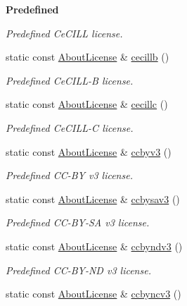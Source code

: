 \begin{Indent}{\bf Predefined}
\begin{DoxyCompactItemize}
\begin{DoxyCompactList}\small\item\em Predefined Ce\-C\-I\-L\-L license. \end{DoxyCompactList}\item 
static const \hyperlink{exceptionmagrathea_1_1AboutLicense}{About\-License} \& \hyperlink{exceptionmagrathea_1_1AboutLicense_a9ca054706cf0da00d216611cb4c56c69}{cecillb} ()
\begin{DoxyCompactList}\small\item\em Predefined Ce\-C\-I\-L\-L-\/\-B license. \end{DoxyCompactList}\item 
static const \hyperlink{exceptionmagrathea_1_1AboutLicense}{About\-License} \& \hyperlink{exceptionmagrathea_1_1AboutLicense_a393f259609519de6f93ec45ad0ff1cad}{cecillc} ()
\begin{DoxyCompactList}\small\item\em Predefined Ce\-C\-I\-L\-L-\/\-C license. \end{DoxyCompactList}\item 
static const \hyperlink{exceptionmagrathea_1_1AboutLicense}{About\-License} \& \hyperlink{exceptionmagrathea_1_1AboutLicense_af9e58435e2ec919b355d4b02ed1b4ee3}{ccbyv3} ()
\begin{DoxyCompactList}\small\item\em Predefined C\-C-\/\-B\-Y v3 license. \end{DoxyCompactList}\item 
static const \hyperlink{exceptionmagrathea_1_1AboutLicense}{About\-License} \& \hyperlink{exceptionmagrathea_1_1AboutLicense_a47208c66133ca568b754ce7e9cf8e7db}{ccbysav3} ()
\begin{DoxyCompactList}\small\item\em Predefined C\-C-\/\-B\-Y-\/\-S\-A v3 license. \end{DoxyCompactList}\item 
static const \hyperlink{exceptionmagrathea_1_1AboutLicense}{About\-License} \& \hyperlink{exceptionmagrathea_1_1AboutLicense_a9d2eed067d328ceac14578f02b4c3ec7}{ccbyndv3} ()
\begin{DoxyCompactList}\small\item\em Predefined C\-C-\/\-B\-Y-\/\-N\-D v3 license. \end{DoxyCompactList}\item 
static const \hyperlink{exceptionmagrathea_1_1AboutLicense}{About\-License} \& \hyperlink{exceptionmagrathea_1_1AboutLicense_ab613b370c6ef6df5fb81abef120be848}{ccbyncv3} ()

\end{DoxyCompactItemize}
\end{Indent}

